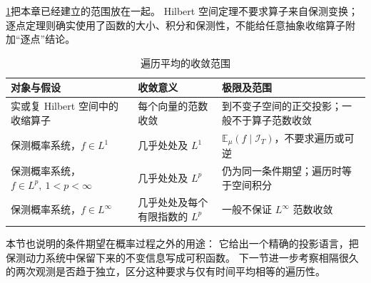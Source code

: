 \ProseParagraphBreak

\cref{b1:tab:ergodic-convergence-32}把本章已经建立的范围放在一起。
Hilbert 空间定理不要求算子来自保测变换；
逐点定理则确实使用了函数的大小、积分和保测性，不能给任意抽象收缩算子附加“逐点”结论。

\begin{table}[htbp]
\centering
\caption{遍历平均的收敛范围}
\label{b1:tab:ergodic-convergence-32}
\small
\begin{tabularx}{\textwidth}{p{8.6em}p{7.4em}X}
\toprule
对象与假设 & 收敛意义 & 极限及范围 \\
\midrule
实或复 Hilbert 空间中的收缩算子 & 每个向量的范数收敛 &
到不变子空间的正交投影；一般不于算子范数收敛 \\
保测概率系统，\(f\in L^1\) & 几乎处处及 \(L^1\) &
\(\mathbb E_\mu(f\mid\mathcal I_T)\)，不要求遍历或可逆 \\
保测概率系统，\(f\in L^p,\ 1<p<\infty\) & 几乎处处及 \(L^p\) &
仍为同一条件期望；遍历时等于空间积分 \\
保测概率系统，\(f\in L^\infty\) & 几乎处处及每个有限指数的 \(L^p\) &
一般不保证 \(L^\infty\) 范数收敛 \\
\bottomrule
\end{tabularx}
\end{table}

本节也说明的条件期望在概率过程之外的用途：
它给出一个精确的投影语言，把保测动力系统中保留下来的不变信息写成可积函数。
下一节进一步考察相隔很久的两次观测是否趋于独立，区分这种要求与仅有时间平均相等的遍历性。
